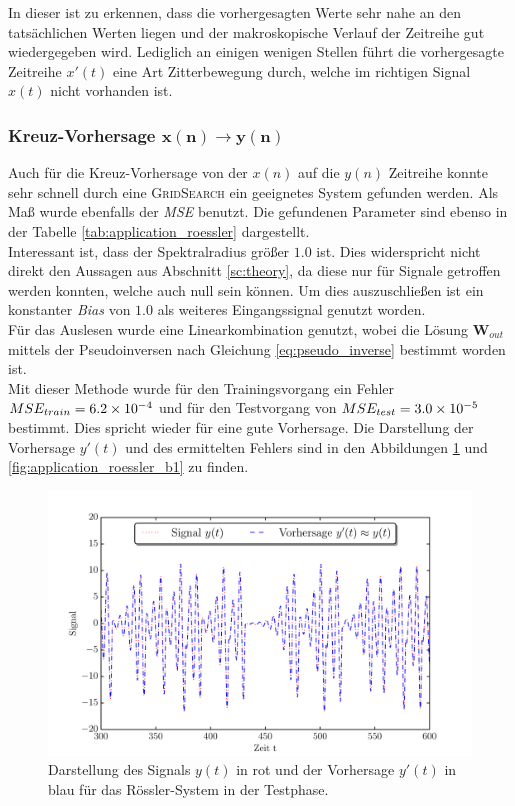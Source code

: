 In dieser ist zu erkennen, dass die vorhergesagten Werte sehr nahe an den tatsächlichen Werten liegen und der makroskopische Verlauf der Zeitreihe gut wiedergegeben wird. Lediglich an einigen wenigen Stellen führt die vorhergesagte Zeitreihe $x'(t)$ eine Art Zitterbewegung durch, welche im richtigen Signal $x(t)$ nicht vorhanden ist.


\subsubsection[Kreuz-Vorhersage $x(n) \rightarrow y(n)$]{Kreuz-Vorhersage $\pmb{x(n) \rightarrow y(n)}$}
Auch für die Kreuz-Vorhersage von der $x(n)$ auf die $y(n)$ Zeitreihe konnte sehr schnell durch eine \textsc{GridSearch} ein geeignetes System gefunden werden. Als Maß wurde ebenfalls der \textit{MSE} benutzt. Die gefundenen Parameter sind ebenso in der Tabelle \ref{tab:application_roessler} dargestellt.\\
Interessant ist, dass der Spektralradius größer $1.0$ ist. Dies widerspricht nicht direkt den Aussagen aus Abschnitt \ref{sc:theory}, da diese nur für Signale getroffen werden konnten, welche auch null sein können. Um dies auszuschließen ist ein konstanter \textit{Bias} von $1.0$ als weiteres Eingangssignal genutzt worden.\\
Für das Auslesen wurde eine Linearkombination genutzt, wobei die Lösung $\mathbf{W}_{out}$ mittels der Pseudoinversen nach Gleichung \ref{eq:pseudo_inverse} bestimmt worden ist.\\

Mit dieser Methode wurde für den Trainingsvorgang ein Fehler $MSE_{train} = \num{6.2E-4}$ und für den Testvorgang von $MSE_{test} = \num{3.0E-5}$ bestimmt. Dies spricht wieder für eine gute Vorhersage. Die Darstellung der Vorhersage $y'(t)$ und des ermittelten Fehlers sind in den Abbildungen \ref{fig:application_roessler_b2} und \ref{fig:application_roessler_b1} zu finden.

\begin{figure}[H]
    \centering
     \includegraphics[width = 0.9 \textwidth]{figures/roessler_cross_pred.pdf}
      \caption{Darstellung des Signals $y(t)$ in rot und der Vorhersage $y'(t)$ in blau für das Rössler-System in der Testphase.}
    \label{fig:application_roessler_b2}
\end{figure}

